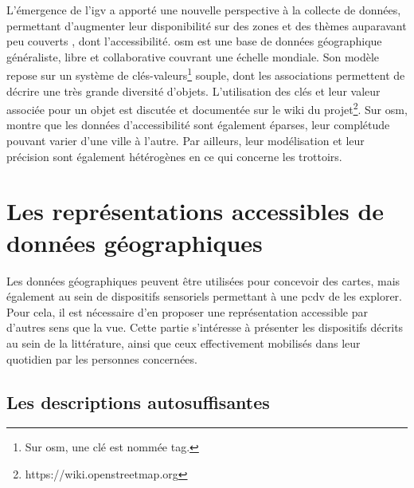 
\newpar{}

L'émergence de l'\gls{igv} a apporté une nouvelle perspective à la collecte de données, permettant d'augmenter leur disponibilité sur des zones et des thèmes auparavant peu couverts \citep{Goodchild2007}, dont l'accessibilité. \gls{osm} est une base de données géographique généraliste, libre et collaborative couvrant une échelle mondiale. Son modèle repose sur un système de clés-valeurs\footnote{Sur \gls{osm}, une clé est nommée tag.} souple, dont les associations permettent de décrire une très grande diversité d'objets. L'utilisation des clés et leur valeur associée pour un objet est discutée et documentée \citep{Ballatore2015} sur le wiki du projet\footnote{https://wiki.openstreetmap.org}. Sur \gls{osm}, \citet{Mobasheri2017} montre que les données d'accessibilité sont également éparses, leur complétude pouvant varier d'une ville à l'autre. Par ailleurs, leur modélisation et leur précision sont également hétérogènes \citep{Biagi2020} en ce qui concerne les trottoirs.


\section{Les représentations accessibles de données géographiques}


Les données géographiques peuvent être utilisées pour concevoir des cartes, mais également au sein de dispositifs sensoriels permettant à une \gls{pcdv} de les explorer. Pour cela, il est nécessaire d'en proposer une représentation accessible par d'autres sens que la vue. Cette partie s'intéresse à présenter les dispositifs décrits au sein de la littérature, ainsi que ceux effectivement mobilisés dans leur quotidien par les personnes concernées.

\subsection{Les descriptions autosuffisantes}

\label{ea_description_autosuffisante}

